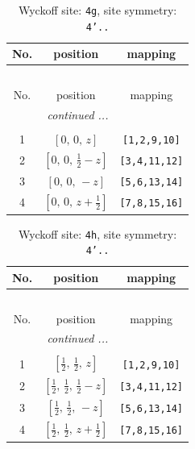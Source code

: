\documentclass[fleqn,8pt]{jsarticle}
\begin{document}
\renewcommand{\arraystretch}{1.2}
\begin{longtable}{ccc}
\caption{Wyckoff site: {\tt 4g}, site symmetry: {\tt 4'..}}
 \\
 \hline \hline
No. & position & mapping \\ \hline \endfirsthead

\multicolumn{2}{l}{\tablename\ \thetable{}} \\
 \hline \hline
No. & position & mapping \\ \hline \endhead

 \hline \hline
\multicolumn{2}{r}{\footnotesize\it continued ...} \\ \endfoot

 \hline \hline
\multicolumn{2}{r}{} \\ \endlastfoot

1 & $\left[ 0,\, 0,\, z \right]$ & {\tt [1,2,9,10]} \\ \hline
2 & $\left[ 0,\, 0,\, \frac{1}{2} - z \right]$ & {\tt [3,4,11,12]} \\ \hline
3 & $\left[ 0,\, 0,\, - z \right]$ & {\tt [5,6,13,14]} \\ \hline
4 & $\left[ 0,\, 0,\, z + \frac{1}{2} \right]$ & {\tt [7,8,15,16]} \\
\end{longtable}
\renewcommand{\arraystretch}{1.2}
\begin{longtable}{ccc}
\caption{Wyckoff site: {\tt 4h}, site symmetry: {\tt 4'..}}
 \\
 \hline \hline
No. & position & mapping \\ \hline \endfirsthead

\multicolumn{2}{l}{\tablename\ \thetable{}} \\
 \hline \hline
No. & position & mapping \\ \hline \endhead

 \hline \hline
\multicolumn{2}{r}{\footnotesize\it continued ...} \\ \endfoot

 \hline \hline
\multicolumn{2}{r}{} \\ \endlastfoot

1 & $\left[ \frac{1}{2},\, \frac{1}{2},\, z \right]$ & {\tt [1,2,9,10]} \\ \hline
2 & $\left[ \frac{1}{2},\, \frac{1}{2},\, \frac{1}{2} - z \right]$ & {\tt [3,4,11,12]} \\ \hline
3 & $\left[ \frac{1}{2},\, \frac{1}{2},\, - z \right]$ & {\tt [5,6,13,14]} \\ \hline
4 & $\left[ \frac{1}{2},\, \frac{1}{2},\, z + \frac{1}{2} \right]$ & {\tt [7,8,15,16]} \\
\end{longtable}
\end{document}
